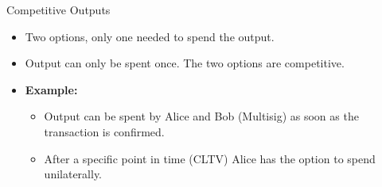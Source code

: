\documentclass[handout]{beamer}
\begin{document}
\begin{frame}{Competitive Outputs}
\begin{minipage}{0.3\textwidth}
\begin{figure}
		\end{figure}
	\end{minipage}%
	\hfill
	\begin{minipage}{0.6\textwidth}
		\begin{itemize}
			\item<1-> Two options, only one needed to spend the output.
			\item<2-> Output can only be spent once. The two options are competitive.
			\vspace{0.25cm}
			\item<3-> \textbf{Example:}
			\begin{itemize}
				\item<3-> Output can be spent by Alice and Bob (Multisig) as soon as the transaction is confirmed.
				\item<4-> After a specific point in time (CLTV) Alice has the option to spend unilaterally.
			\end{itemize}
		\end{itemize}
	\end{minipage}
\end{frame}

\end{document}
